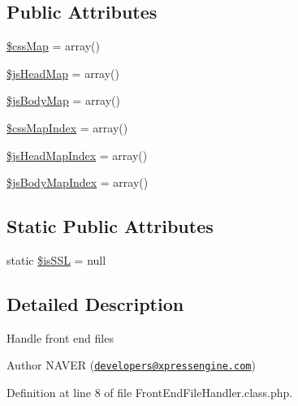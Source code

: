 \subsection*{Public Attributes}
\begin{DoxyCompactItemize}
\item 
\hyperlink{classFrontEndFileHandler_ae7470e6b48cdd0b76b8bd0fd8e38850c}{\$css\+Map} = array()
\item 
\hyperlink{classFrontEndFileHandler_ab434f9c8c874aaf8186e259dff95d116}{\$js\+Head\+Map} = array()
\item 
\hyperlink{classFrontEndFileHandler_ad03de614a088bc386c393543a3cd9aed}{\$js\+Body\+Map} = array()
\item 
\hyperlink{classFrontEndFileHandler_a61df1d725cd1884fd0a260dec738a4b7}{\$css\+Map\+Index} = array()
\item 
\hyperlink{classFrontEndFileHandler_a151a55b31ffaec411a86b7f618eed4ac}{\$js\+Head\+Map\+Index} = array()
\item 
\hyperlink{classFrontEndFileHandler_aba61415d3f993f1f6b9cddc0024f50b1}{\$js\+Body\+Map\+Index} = array()
\end{DoxyCompactItemize}
\subsection*{Static Public Attributes}
\begin{DoxyCompactItemize}
\item 
static \hyperlink{classFrontEndFileHandler_a1e709934ab4023d10850268064d771bc}{\$is\+S\+S\+L} = null
\end{DoxyCompactItemize}


\subsection{Detailed Description}
Handle front end files \begin{DoxyAuthor}{Author}
N\+A\+V\+E\+R (\href{mailto:developers@xpressengine.com}{\tt developers@xpressengine.\+com}) 
\end{DoxyAuthor}


Definition at line 8 of file Front\+End\+File\+Handler.\+class.\+php.




